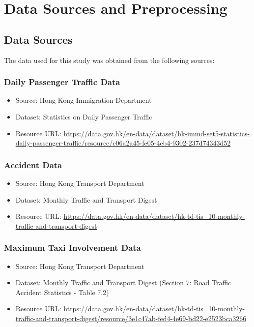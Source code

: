 \documentclass{article}
\begin{document}
\section{Data Sources and Preprocessing}

\subsection{Data Sources}
The data used for this study was obtained from the following sources:

\subsubsection{Daily Passenger Traffic Data}
\begin{itemize}
  \item Source: Hong Kong Immigration Department
  \item Dataset: Statistics on Daily Passenger Traffic
  \item Resource URL: \url{https://data.gov.hk/en-data/dataset/hk-immd-set5-statistics-daily-passenger-traffic/resource/e06a2a45-fe05-4eb4-9302-237d74343d52}

\end{itemize}

\subsubsection{Accident Data}
\begin{itemize}
  \item Source: Hong Kong Transport Department
  \item Dataset: Monthly Traffic and Transport Digest
  \item Resource URL: \url{https://data.gov.hk/en-data/dataset/hk-td-tis_10-monthly-traffic-and-transport-digest}

\end{itemize}

\subsubsection{Maximum Taxi Involvement Data}
\begin{itemize}
  \item Source: Hong Kong Transport Department
  \item Dataset: Monthly Traffic and Transport Digest (Section 7: Road Traffic Accident Statistics - Table 7.2)
  \item Resource URL: \url{https://data.gov.hk/en-data/dataset/hk-td-tis_10-monthly-traffic-and-transport-digest/resource/3e1c47ab-fed4-4e69-bd22-e2523bca3266}

\end{itemize}
\end{document}
